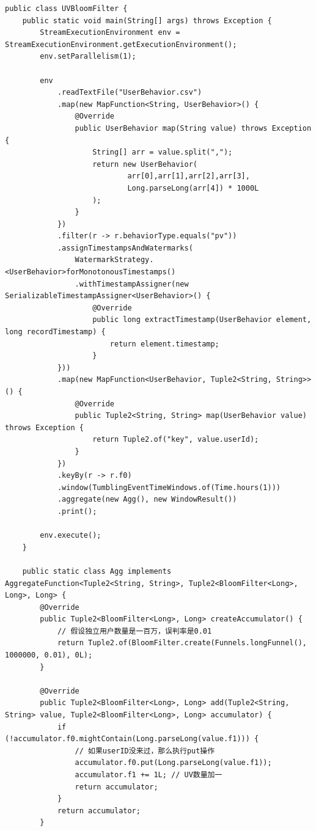 \documentclass[cn,11pt,chinese]{elegantbook}
\begin{document}
\begin{verbatim}
public class UVBloomFilter {
    public static void main(String[] args) throws Exception {
        StreamExecutionEnvironment env = StreamExecutionEnvironment.getExecutionEnvironment();
        env.setParallelism(1);

        env
            .readTextFile("UserBehavior.csv")
            .map(new MapFunction<String, UserBehavior>() {
                @Override
                public UserBehavior map(String value) throws Exception {
                    String[] arr = value.split(",");
                    return new UserBehavior(
                            arr[0],arr[1],arr[2],arr[3],
                            Long.parseLong(arr[4]) * 1000L
                    );
                }
            })
            .filter(r -> r.behaviorType.equals("pv"))
            .assignTimestampsAndWatermarks(
                WatermarkStrategy.<UserBehavior>forMonotonousTimestamps()
                .withTimestampAssigner(new SerializableTimestampAssigner<UserBehavior>() {
                    @Override
                    public long extractTimestamp(UserBehavior element, long recordTimestamp) {
                        return element.timestamp;
                    }
            }))
            .map(new MapFunction<UserBehavior, Tuple2<String, String>>() {
                @Override
                public Tuple2<String, String> map(UserBehavior value) throws Exception {
                    return Tuple2.of("key", value.userId);
                }
            })
            .keyBy(r -> r.f0)
            .window(TumblingEventTimeWindows.of(Time.hours(1)))
            .aggregate(new Agg(), new WindowResult())
            .print();

        env.execute();
    }

    public static class Agg implements AggregateFunction<Tuple2<String, String>, Tuple2<BloomFilter<Long>, Long>, Long> {
        @Override
        public Tuple2<BloomFilter<Long>, Long> createAccumulator() {
            // 假设独立用户数量是一百万，误判率是0.01
            return Tuple2.of(BloomFilter.create(Funnels.longFunnel(), 1000000, 0.01), 0L);
        }

        @Override
        public Tuple2<BloomFilter<Long>, Long> add(Tuple2<String, String> value, Tuple2<BloomFilter<Long>, Long> accumulator) {
            if (!accumulator.f0.mightContain(Long.parseLong(value.f1))) {
                // 如果userID没来过，那么执行put操作
                accumulator.f0.put(Long.parseLong(value.f1));
                accumulator.f1 += 1L; // UV数量加一
                return accumulator;
            }
            return accumulator;
        }


\end{verbatim}
\end{document}
